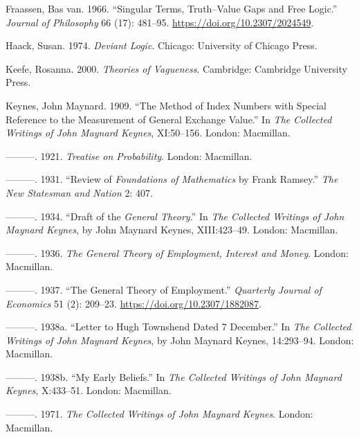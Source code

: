 \documentclass[noflushend]{philosophersimprint}
\newlength{\cslhangindent}
\newenvironment{CSLReferences}[3] %
 {%
  \setlength{\parindent}{0pt}
  \ifodd #1 \everypar{\setlength{\hangindent}{\cslhangindent}}\ignorespaces\fi
  \ifnum #2 > 0
  \setlength{\parskip}{#2\baselineskip}
  \fi
 }%
 {}
\begin{document}
\begin{CSLReferences}{1}{0}
\leavevmode{}%
Fraassen, Bas van. 1966. {``Singular Terms, Truth--Value Gaps and Free
Logic.''} \emph{Journal of Philosophy} 66 (17): 481--95.
\url{https://doi.org/10.2307/2024549}.

\leavevmode{}%
Haack, Susan. 1974. \emph{Deviant Logic}. Chicago: University of Chicago
Press.

\leavevmode{}%
Keefe, Rosanna. 2000. \emph{Theories of Vagueness}. Cambridge: Cambridge
University Press.

\leavevmode{}%
Keynes, John Maynard. 1909. {``The Method of Index Numbers with Special
Reference to the Measurement of General Exchange Value.''} In \emph{The
Collected Writings of John Maynard Keynes}, XI:50--156. London:
Macmillan.

\leavevmode{}%
---------. 1921. \emph{Treatise on Probability}. London: Macmillan.

\leavevmode{}%
---------. 1931. {``Review of \emph{Foundations of Mathematics} by Frank
Ramsey.''} \emph{The New Statesman and Nation} 2: 407.

\leavevmode{}%
---------. 1934. {``Draft of the \emph{General Theory}.''} In \emph{The
Collected Writings of John Maynard Keynes}, by John Maynard Keynes,
XIII:423--49. London: Macmillan.

\leavevmode{}%
---------. 1936. \emph{The General Theory of Employment, Interest and
Money}. London: Macmillan.

\leavevmode{}%
---------. 1937. {``The General Theory of Employment.''} \emph{Quarterly
Journal of Economics} 51 (2): 209--23.
\url{https://doi.org/10.2307/1882087}.

\leavevmode{}%
---------. 1938a. {``Letter to Hugh Townshend Dated 7 December.''} In
\emph{The Collected Writings of John Maynard Keynes}, by John Maynard
Keynes, 14:293--94. London: Macmillan.

\leavevmode{}%
---------. 1938b. {``My Early Beliefs.''} In \emph{The Collected
Writings of John Maynard Keynes}, X:433--51. London: Macmillan.

\leavevmode{}%
---------. 1971. \emph{The Collected Writings of John Maynard Keynes}.
London: Macmillan.


\end{CSLReferences}
\end{document}

